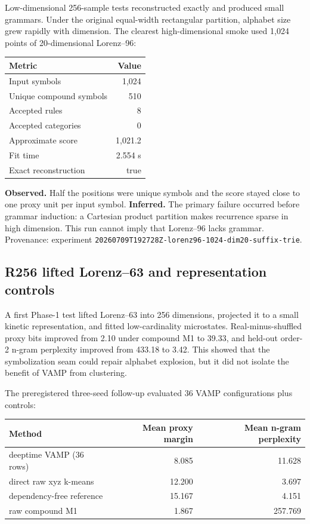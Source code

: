 \documentclass[10pt]{article}
\newcommand{\obs}{\textbf{Observed.}}
\newcommand{\inferd}{\textbf{Inferred.}}
\begin{document}
Low-dimensional 256-sample tests reconstructed exactly and produced small
grammars. Under the original equal-width rectangular partition, alphabet size
grew rapidly with dimension. The clearest high-dimensional smoke used 1,024
points of 20-dimensional Lorenz--96:

\begin{center}
\begin{tabular}{lr}
\toprule
Metric & Value \\
\midrule
Input symbols & 1,024 \\
Unique compound symbols & 510 \\
Accepted rules & 8 \\
Accepted categories & 0 \\
Approximate score & 1,021.2 \\
Fit time & 2.554 s \\
Exact reconstruction & true \\
\bottomrule
\end{tabular}
\end{center}

\obs{} Half the positions were unique symbols and the score stayed close to
one proxy unit per input symbol. \inferd{} The primary failure occurred before
grammar induction: a Cartesian product partition makes recurrence sparse in
high dimension. This run cannot imply that Lorenz--96 lacks grammar.
Provenance: experiment
\texttt{20260709T192728Z-lorenz96-1024-dim20-suffix-trie}.

\subsection{R256 lifted Lorenz--63 and representation controls}

A first Phase-1 test lifted Lorenz--63 into 256 dimensions, projected it to a
small kinetic representation, and fitted low-cardinality microstates.
Real-minus-shuffled proxy bits improved from 2.10 under compound M1 to 39.33,
and held-out order-2 n-gram perplexity improved from 433.18 to 3.42. This
showed that the symbolization seam could repair alphabet explosion, but it did
not isolate the benefit of VAMP from clustering.

The preregistered three-seed follow-up evaluated 36 VAMP configurations plus
controls:

\begin{center}
\begin{tabular}{lrr}
\toprule
Method & Mean proxy margin & Mean n-gram perplexity \\
\midrule
deeptime VAMP (36 rows) & 8.085 & 11.628 \\
direct raw xyz k-means & 12.200 & 3.697 \\
dependency-free reference & 15.167 & 4.151 \\
raw compound M1 & 1.867 & 257.769 \\
\bottomrule
\end{tabular}
\end{center}
\end{document}
